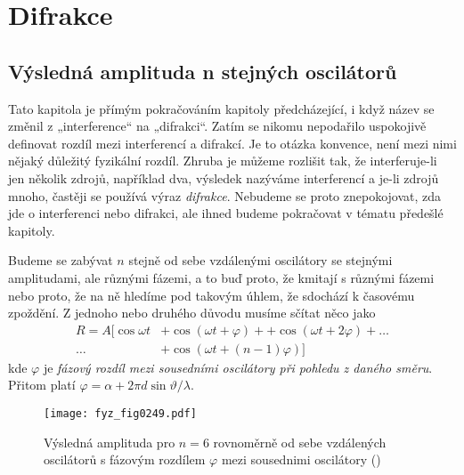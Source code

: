 \setchaptertoc
\chapter{Difrakce}\label{fyz:IchapXXX}
  \section{Výsledná amplituda n stejných oscilátorů}\label{fyz:IchapXXXsecI}
    Tato kapitola je přímým pokračováním kapitoly předcházející, i když název se změnil z 
    „interference“ na „difrakci“. Zatím se nikomu nepodařilo uspokojivě definovat rozdíl mezi 
    interferencí a difrakcí. Je to otázka konvence, není mezi nimi nějaký důležitý fyzikální 
    rozdíl. Zhruba je můžeme rozlišit tak, že interferuje-li jen několik zdrojů, například dva, 
    výsledek nazýváme interferencí a je-li zdrojů mnoho, častěji se používá výraz \emph{difrakce}. 
    Nebudeme se proto znepokojovat, zda jde o interferenci nebo difrakci, ale ihned budeme 
    pokračovat v tématu předešlé kapitoly.
    
    Budeme se zabývat \(n\) stejně od sebe vzdálenými oscilátory se stejnými amplitudami, ale 
    různými fázemi, a to buď proto, že kmitají s různými fázemi nebo proto, že na ně hledíme pod 
    takovým úhlem, že sdochází k časovému zpoždění. Z jednoho nebo druhého důvodu musíme sčítat 
    něco jako
    \begin{align}\label{fyz:eq316}
      R = A\big[\cos\omega t &+ \cos(\omega t +  \varphi) +
                              + \cos(\omega t + 2\varphi) + \ldots \nonumber  \\
                      \ldots &+ \cos(\omega t + (n-1)\varphi)\big]
    \end{align}
    kde \(\varphi\) je \emph{fázový rozdíl mezi sousedními oscilátory při pohledu z daného směru}. 
    Přitom platí \(\varphi = \alpha + 2\pi d\sin\vartheta/\lambda\).

    \begin{figure}[ht!] %
      \centering
      \texttt{[image: fyz\_fig0249.pdf]}
      \caption{Výsledná amplituda pro \(n = 6\) rovnoměrně od sebe vzdálených oscilátorů s fázovým 
               rozdílem \(\varphi\) mezi sousednimi oscilátory
               (\cite[s.~392]{Feynman01})}
      \label{fyz:fig0249}
    \end{figure}
    
